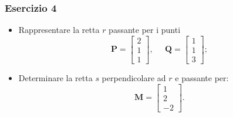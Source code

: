 \documentclass{beamer}
\begin{document}
    
%
%
\begin{frame}
\frametitle{Esercizio 4}
\begin{itemize}
\item Rappresentare la retta $r$ passante per i punti
\begin{displaymath}
\mathbf{P}=\begin{bmatrix}2\\1\\1 \end{bmatrix},\;\;\;\;\;
\mathbf{Q}=\begin{bmatrix}1\\1\\3 \end{bmatrix};
\end{displaymath}
\item Determinare la retta $s$ perpendicolare ad $r$ e passante per:
\begin{displaymath}
\mathbf{M}=\begin{bmatrix}1\\2\\-2 \end{bmatrix}.
\end{displaymath}
\end{itemize}
\end{frame}
\end{document}
